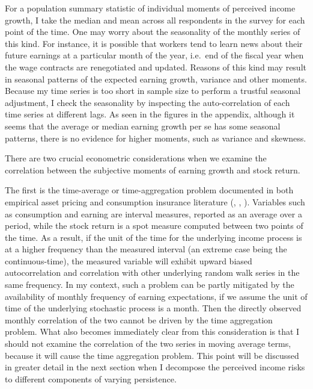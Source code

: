 \documentclass[12pt,notitlepage,onecolumn,aps,pra]{article}
\begin{document}
For a population summary statistic of individual moments of perceived
income growth, I take the median and mean across all respondents in the
survey for each point of the time. One may worry about the seasonality
of the monthly series of this kind. For instance, it is possible that
workers tend to learn news about their future earnings at a particular
month of the year, i.e.~end of the fiscal year when the wage contracts
are renegotiated and updated. Reasons of this kind may result in
seasonal patterns of the expected earning growth, variance and other
moments. Because my time series is too short in sample size to perform a
trustful seasonal adjustment, I check the seasonality by inspecting the
auto-correlation of each time series at different lags. As seen in the
figures in the appendix, although it seems that the average or median
earning growth per se has some seasonal patterns, there is no evidence
for higher moments, such as variance and skewness.

There are two crucial econometric considerations when we examine the
correlation between the subjective moments of earning growth and stock
return.

The first is the time-average or time-aggregation problem documented in
both empirical asset pricing and consumption insurance literature
(\cite{working_note_1960}, \cite{jagannathan_lazy_2007},
\cite{crawley_search_2019}). Variables such as consumption and earning
are interval measures, reported as an average over a period, while the
stock return is a spot measure computed between two points of the time.
As a result, if the unit of the time for the underlying income process
is at a higher frequency than the measured interval (an extreme case
being the continuous-time), the measured variable will exhibit upward
biased autocorrelation and correlation with other underlying random walk
series in the same frequency. In my context, such a problem can be
partly mitigated by the availability of monthly frequency of earning
expectations, if we assume the unit of time of the underlying stochastic
process is a month. Then the directly observed monthly correlation of
the two cannot be driven by the time aggregation problem. What also
becomes immediately clear from this consideration is that I should not
examine the correlation of the two series in moving average terms,
because it will cause the time aggregation problem. This point will be
discussed in greater detail in the next section when I decompose the
perceived income risks to different components of varying persistence.
\end{document}
